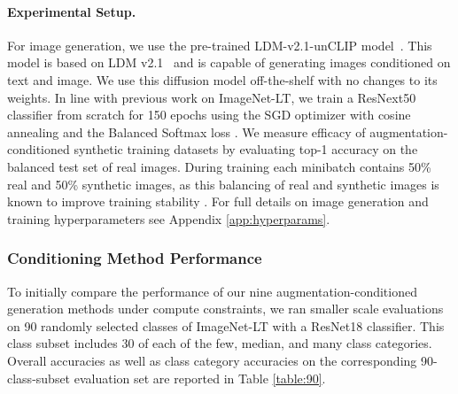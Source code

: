 \vspace{-0.2cm}
\paragraph{Experimental Setup.} For image generation, we use the pre-trained LDM-v2.1-unCLIP model~\citep{stable_unclip}. This model is based on LDM v2.1~\citep{stablediffusion} and is capable of generating images conditioned on text and image. We use this diffusion model off-the-shelf with no changes to its weights. In line with previous work on ImageNet-LT, we train a ResNext50 \citep{rexnext} classifier from scratch for 150 epochs using the SGD optimizer with cosine annealing \citep{sgd_cosine} and the Balanced Softmax loss \citep{balanced_softmax}.
We measure efficacy of augmentation-conditioned synthetic training datasets by evaluating top-1 accuracy on the balanced test set of real images.
During training each minibatch contains 50\% real and 50\% synthetic images, as this balancing of real and synthetic images is known to improve training stability \citep{feedbackguided, da-fusion, is_synthetic_data}. 
For full details on image generation and training hyperparameters see Appendix \ref{app:hyperparams}.

\vspace{-0.15cm}
\subsubsection{Conditioning Method Performance} \label{sec:90_subset}
\vspace{-0.2cm}

To initially compare the performance of our nine augmentation-conditioned generation methods under compute constraints, we ran smaller scale evaluations on 90 randomly selected classes of ImageNet-LT with a ResNet18 classifier. This class subset includes 30 of each of the few, median, and many class categories. Overall accuracies as well as class category accuracies on the corresponding 90-class-subset evaluation set are reported in Table \ref{table:90}.

